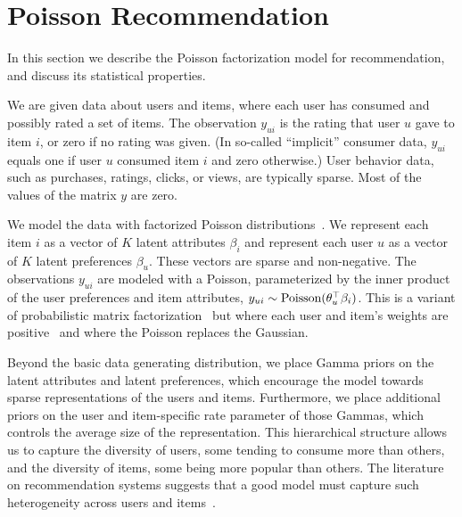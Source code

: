 \section{Poisson Recommendation}
\label{sec:model}


In this section we describe the Poisson factorization model for
recommendation, and discuss its statistical properties.

We are given data about users and items, where each user has consumed
and possibly rated a set of items.  The observation $y_{ui}$ is the
rating that user $u$ gave to item $i$, or zero if no rating was given.
(In so-called ``implicit'' consumer data, $y_{ui}$ equals one if user
$u$ consumed item $i$ and zero otherwise.)  User behavior data, such
as purchases, ratings, clicks, or views, are typically sparse.  Most
of the values of the matrix $y$ are zero.

We model the data with factorized Poisson
distributions~\cite{Canny:2004}.  We represent each item $i$ as a
vector of $K$ latent attributes $\beta_i$ and represent each user $u$
as a vector of $K$ latent preferences $\beta_u$.  These vectors are
sparse and non-negative.  The observations $y_{ui}$ are modeled with a
Poisson, parameterized by the inner product of the user preferences
and item attributes, $y_{ui} \sim \textrm{Poisson}(\theta_u^\top \beta_i)$.
This is a variant of probabilistic matrix
factorization~\cite{Salakhutdinov:2008a} but where each user and
item's weights are positive~\cite{Lee:1999} and where the Poisson
replaces the Gaussian.

Beyond the basic data generating distribution, we place Gamma priors
on the latent attributes and latent preferences, which encourage the
model towards sparse representations of the users and items.
Furthermore, we place additional priors on the user and item-specific
rate parameter of those Gammas, which controls the average size of the
representation.  This hierarchical structure allows us to capture the
diversity of users, some tending to consume more than others, and the
diversity of items, some being more popular than others.  The
literature on recommendation systems suggests that a good model must
capture such heterogeneity across users and items~\cite{Koren:2009}.


